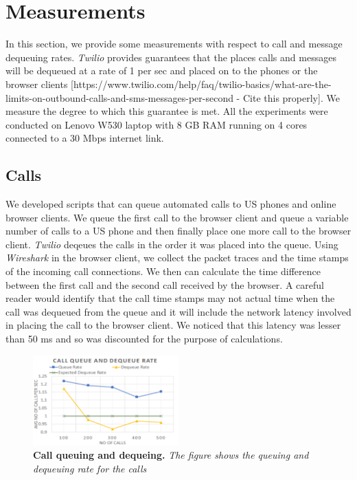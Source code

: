 \section{Measurements}
\label{sec-measurements}

In this section, we provide some measurements with respect to call and message dequeuing rates. \textit{Twilio} provides guarantees that the places calls and messages will be dequeued at a rate of 1 per sec and placed on to the phones or the browser clients [https://www.twilio.com/help/faq/twilio-basics/what-are-the-limits-on-outbound-calls-and-sms-messages-per-second - Cite this properly]. We measure the degree to which this guarantee is met. All the experiments were conducted on Lenovo W530 laptop with 8 GB RAM running on 4 cores connected to a 30 Mbps internet link.

\subsection{Calls}
\label{sec-measurements-calls}
We developed scripts that can queue automated calls to US phones and online browser clients. We queue the first call to the browser client and queue a variable number of calls to a US phone and then finally place one more call to the browser client. \textit{Twilio} deqeues the calls in the order it was placed into the queue. Using \textit{Wireshark} in the browser client, we collect the packet traces and the time stamps of the incoming call connections. We then can calculate the time difference between the first call and the second call received by the browser. A careful reader would identify that the call time stamps may not actual time when the call was dequeued from the queue and it will include the network latency involved in placing the call to the browser client. We noticed that this latency was lesser than 50 ms and so was discounted for the purpose of calculations. 

\begin{figure}[h!] \centering
\includegraphics[width=0.5\textwidth]{graphs/calls.pdf}
\caption{\label{fig-calls}\textbf{Call queuing and dequeing.} {\footnotesize\textit{
The figure shows the queuing and dequeuing rate for the calls
}}}
\end{figure}

